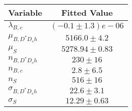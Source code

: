 \begin{tabular}[t]{lc}
\hline
Variable &Fitted Value\\
\hline\hline
$\lambda_{B,c}$&$(-0.1\pm1.3)e-06$\\
\hline
$\mu_{B, D^* D_s h}$&$5166.0\pm4.2$\\
\hline
$\mu_S$&$5278.94\pm0.83$\\
\hline
$n_{B, D^* D_s h}$&$230\pm16$\\
\hline
$n_{B,c}$&$2.8\pm6.5$\\
\hline
$n_S$&$516\pm16$\\
\hline
$\sigma_{B, D^* D_s h}$&$22.6\pm3.1$\\
\hline
$\sigma_S$&$12.29\pm0.63$\\
\hline
\end{tabular}